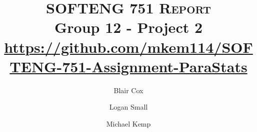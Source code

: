 
\title{\vspace{-1.5cm}
	\normalfont \normalsize \textsc{SOFTENG 751 Report} \\ [10pt]
	\huge Group 12 - Project 2 \\ [10pt]
	\normalsize{\url{https://github.com/mkem114/SOFTENG-751-Assignment-ParaStats}}
}
\date{}
 

\usepackage{authblk}
\author[1]{Blair Cox}
\author[2]{Logan Small}
\author[1]{Michael Kemp}
